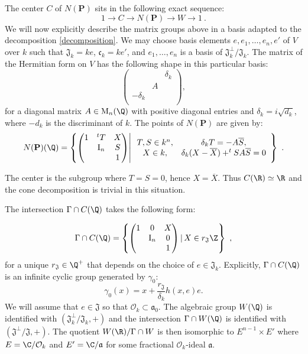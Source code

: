 \documentclass[11pt,letterpaper,english]{amsart}
\numberwithin{equation}{subsection}
\numberwithin{equation}{section}
\newcommand\cO{{\mathcal O}}
\newcommand\fJ{{\mathfrak J}}
\newcommand\bfP{{\mathbf P}}
\theoremstyle{plain}
\theoremstyle{remark}
\begin{document}
The center $C$ of $N(\bfP)$ sits in the following exact sequence: 
\[1\rightarrow C\rightarrow N(\bfP)\rightarrow W\rightarrow 1~.\]
We will now explicitly describe the matrix groups above in a basis adapted to the decomposition \ref{decomposition}. We may choose basis elements $e,e_1,\ldots,e_n,e'$ of $V$ over $k$ such that $\fJ_k=ke$, $\mathfrak c_k=ke'$, and $e_1,\ldots,e_{n}$ is a basis of $\fJ_k^{\bot}/\fJ_k$. The matrix of the Hermitian form on $V$ has the following shape in this particular basis:
\[\begin{pmatrix}
    & &\delta_k\\
    &A&\\
    -\delta_k& &\\
\end{pmatrix},\]
for a diagonal matrix $A\in \mathrm{M}_n(\Q)$ with positive diagonal entries and $\delta_k=i\sqrt{d_k}$, where $-d_k$ is the discriminant of $k$. The points of $N(\bfP)$ are given by: 
\begin{align*}
N(\bfP)(\Q)=\left\{\begin{pmatrix}
    1& ^tT& X\\ 
    &\mathrm{I}_{n} & S\\
     & & 1\\
\end{pmatrix}\middle|\,\begin{array}{cc} T,S\in k^{n}, & \delta_kT=-A\overline S,\\
X\in k,& \delta_k(X-\overline X)+^tSA\overline S=0\end{array} \right\}~.\end{align*}

The center is the subgroup where $T=S=0$, hence $X=\overline X$. Thus $C(\R)\simeq \R$ and the cone decomposition is trivial in this situation.

The intersection $\Gamma\cap C(\Q)$ takes the following form: 

\[\Gamma\cap C(\Q)=\left\{\begin{pmatrix}
    1& 0& X\\ 
    &\mathrm{I}_{n} & 0\\
     & & 1\\
\end{pmatrix}|\, X\in r_\fJ\Z\right\}~,\]
for a unique $r_\fJ\in \Q^+$ that depends on the choice of $e\in\mathfrak{J}_k$. 
Explicitly, $\Gamma\cap C(\Q)$ is an infinite cyclic group generated by $\gamma_0$:
$$\gamma_0(x) = x + \frac{r_\fJ}{\delta_k} h(x,e)e.$$
We will assume that $e\in \mathfrak J$ so that $\cO_k\subset \mathfrak a_0$.
The algebraic group $W(\Q)$ is identified with $(\mathfrak J_k^\perp/\mathfrak J_k,+)$ and the intersection $\Gamma\cap W(\Q)$ is identified with $(\mathfrak J^\perp/\mathfrak J,+)$. The quotient $W(\R)/\Gamma\cap W$ is then isomorphic to $E^{n-1}\times E'$ where $E=\C/\mathcal{O}_k$ and $E'=\C/\mathfrak{a}$ for some fractional $\mathcal{O}_k$-ideal $\mathfrak{a}$. 
\end{document}
